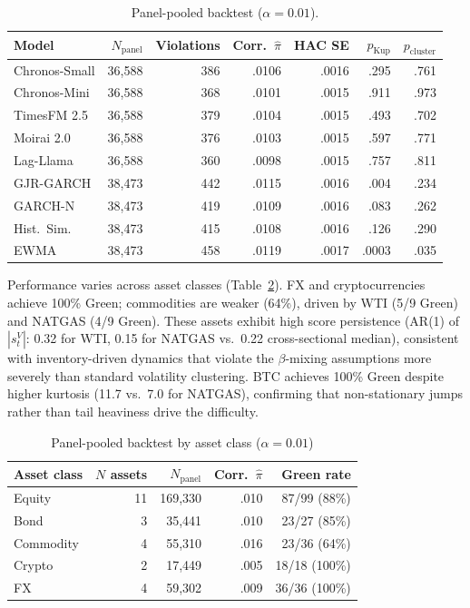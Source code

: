 \documentclass[preprint,11pt,authoryear]{elsarticle}
\newcommand{\1}{\boldsymbol{1}}
\begin{document}
	\begin{table}[H]
		\centering
		\caption{Panel-pooled backtest ($\alpha = 0.01$).}
		\label{tab:panel}
		\footnotesize
		\begin{tabular}{@{}lrrrrrr@{}}
			\toprule
			Model & $N_{\text{panel}}$ & Violations & Corr.\ $\hat\pi$ & HAC SE & $p_{\text{Kup}}$ & $p_{\text{cluster}}$ \\
			\midrule
			Chronos-Small  & 36{,}588 & 386 & .0106 & .0016 & .295 & .761 \\
			Chronos-Mini   & 36{,}588 & 368 & .0101 & .0015 & .911 & .973 \\
			TimesFM 2.5    & 36{,}588 & 379 & .0104 & .0015 & .493 & .702 \\
			Moirai 2.0     & 36{,}588 & 376 & .0103 & .0015 & .597 & .771 \\
			Lag-Llama      & 36{,}588 & 360 & .0098 & .0015 & .757 & .811 \\
			\midrule
			GJR-GARCH      & 38{,}473 & 442 & .0115 & .0016 & .004 & .234 \\
			GARCH-N        & 38{,}473 & 419 & .0109 & .0016 & .083 & .262 \\
			Hist.\ Sim.    & 38{,}473 & 415 & .0108 & .0016 & .126 & .290 \\
			EWMA           & 38{,}473 & 458 & .0119 & .0017 & .0003 & .035 \\
			\bottomrule
		\end{tabular}
	\end{table}
	
	Performance varies across asset classes
	(Table~\ref{tab:panel_by_class}). FX and cryptocurrencies
	achieve 100\% Green; commodities are weaker (64\%), driven
	by WTI (5/9 Green) and NATGAS (4/9 Green). These assets
	exhibit high score persistence (AR(1) of $|s_t^V|$: 0.32
	for WTI, 0.15 for NATGAS vs.\ 0.22 cross-sectional median),
	consistent with inventory-driven dynamics that violate the
	$\beta$-mixing assumptions more severely than standard
	volatility clustering. BTC achieves 100\% Green despite
	higher kurtosis (11.7 vs.\ 7.0 for NATGAS), confirming that
	non-stationary jumps rather than tail heaviness drive the
	difficulty.
	
	\begin{table}[H]
		\centering
		\caption{Panel-pooled backtest by asset class ($\alpha = 0.01$)}
		\label{tab:panel_by_class}
		\footnotesize
		\begin{tabular}{@{}lrrrr@{}}
			\toprule
			Asset class & $N$ assets & $N_{\text{panel}}$ & Corr.\ $\hat\pi$ & Green rate \\
			\midrule
			Equity     & 11 & 169{,}330 & .010 & 87/99 (88\%) \\
			Bond       &  3 &  35{,}441 & .010 & 23/27 (85\%) \\
			Commodity  &  4 &  55{,}310 & .016 & 23/36 (64\%) \\
			Crypto     &  2 &  17{,}449 & .005 & 18/18 (100\%) \\
			FX         &  4 &  59{,}302 & .009 & 36/36 (100\%) \\
			\bottomrule
		\end{tabular}
	\end{table}
	
\end{document}
